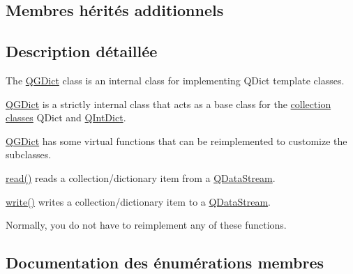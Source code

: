 \subsection*{Membres hérités additionnels}


\subsection{Description détaillée}
The \hyperlink{class_q_g_dict}{Q\+G\+Dict} class is an internal class for implementing Q\+Dict template classes. 

\hyperlink{class_q_g_dict}{Q\+G\+Dict} is a strictly internal class that acts as a base class for the \hyperlink{}{collection classes} Q\+Dict and \hyperlink{class_q_int_dict}{Q\+Int\+Dict}.

\hyperlink{class_q_g_dict}{Q\+G\+Dict} has some virtual functions that can be reimplemented to customize the subclasses. 
\begin{DoxyItemize}
\item \hyperlink{class_q_g_dict_a698c24588a7688bd9c618c17ba2fd7bb}{read()} reads a collection/dictionary item from a \hyperlink{class_q_data_stream}{Q\+Data\+Stream}. 
\item \hyperlink{class_q_g_dict_a352bb41fbce825fe4b597735786c369b}{write()} writes a collection/dictionary item to a \hyperlink{class_q_data_stream}{Q\+Data\+Stream}. 
\end{DoxyItemize}Normally, you do not have to reimplement any of these functions. 

\subsection{Documentation des énumérations membres}
\hypertarget{class_q_g_dict_a4eced3c3c4e5c52360bc2f1bab85412e}{}
